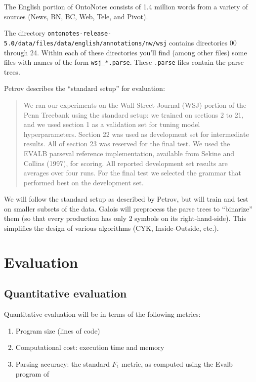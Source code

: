 \documentclass[english]{article}
\begin{document}
The English portion of OntoNotes consists of 1.4 million words from a variety of sources (News, BN, BC, Web, Tele, and Pivot).

The directory \texttt{ontonotes-release-5.0/data/files/data/english/annotations/nw/wsj} contains directories 00 through 24. Within each of these directories you'll find (among other files) some files with names of the form \texttt{wsj\_*.parse}. These \texttt{.parse} files contain the parse trees. 

Petrov describes the ``standard setup'' for evaluation:
\begin{quote}
We ran our experiments on the Wall Street Journal (WSJ) portion of the Penn Treebank using the standard setup: we trained on sections 2 to 21, and we used section 1 as a validation set for tuning model hyperparameters. Section 22 was used as development set for intermediate results. All of section 23 was reserved for the final test. We used the EVALB parseval reference implementation, available from Sekine and Collins (1997), for scoring. All reported development set results are averages over four runs. For the final test we selected the grammar that performed best on the development set.
\end{quote}

We will follow the standard setup as described by Petrov, but will train and test on smaller subsets of the data.  Galois will preprocess the parse trees to ``binarize'' them (so that every production has only 2 symbols on its right-hand-side). This simplifies the design of various algorithms (CYK, Inside-Outside, etc.).

\section{Evaluation}

\subsection{Quantitative evaluation}

Quantitative evaluation will be in terms of the following metrics:
\begin{enumerate}
\item Program size (lines of code)
\item Computational cost: execution time and memory
\item Parsing accuracy: the standard $F_{1}$ metric, as computed using the Evalb program of \citet{Sekine1997}
\end{enumerate}
\end{document}
